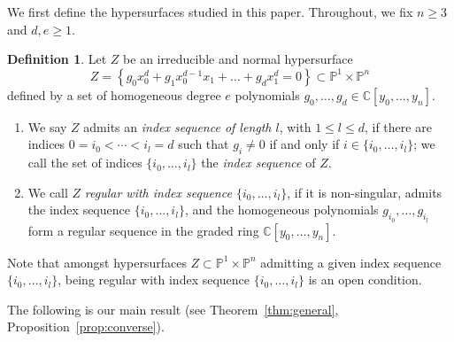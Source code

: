 \documentclass[a4paper,11pt]{amsart}
\theoremstyle{plain}
\theoremstyle{definition}
\newtheorem{definition}[theorem]{Definition}
\newcommand{\C}{\mathbb{C}}
\newcommand{\p}{\mathbb{P}}
\begin{document}
We first define the hypersurfaces studied in this paper. Throughout, we fix $n \geq 3$ and $d,e \geq 1$.

\begin{definition}\label{def:Ztypes}
Let $Z$ be an irreducible and normal hypersurface
\begin{equation} \label{eq:generalZform}
Z = \left\{g_0x_0^d + g_1 x_0^{d-1} x_1 + \ldots + g_d x_1^d=0\right\}\subset\p^1\times\p^n
\end{equation}
defined by a set of homogeneous degree $e$ polynomials $g_0,\dots,g_d \in \C[y_0,\dots,y_n]$.
    \begin{enumerate}
        \item[(i)] We say $Z$ admits an {\em index sequence of length $l$}, with $1 \leq l \leq d$, if there are indices $0 = i_0 < \cdots < i_l = d$ such that $g_i \neq 0$ if and only if $i \in \{i_0,\dots,i_l\}$; we call the set of indices $\{i_0,\dots,i_l\}$ the {\em index sequence} of $Z$.
        \item[(ii)] We call $Z$ {\em regular with index sequence $\{i_0,\ldots, i_l\}$}, if it is non-singular, admits the index sequence $\{i_0,\dots,i_l\}$, and the homogeneous polynomials $g_{i_0},\dots,g_{i_l}$ form a regular sequence in the graded ring $\C[y_0,\dots,y_n]$.
    \end{enumerate}
\end{definition}


Note that 
amongst hypersurfaces $Z\subset\p^1\times\p^n$ admitting a given index sequence $\{i_0,\ldots, i_l\}$, being regular with index sequence $\{i_0,\ldots, i_l\}$ is an open condition. 

The following is our main result (see Theorem~\ref{thm:general}, Proposition~\ref{prop:converse}). 
\end{document}
